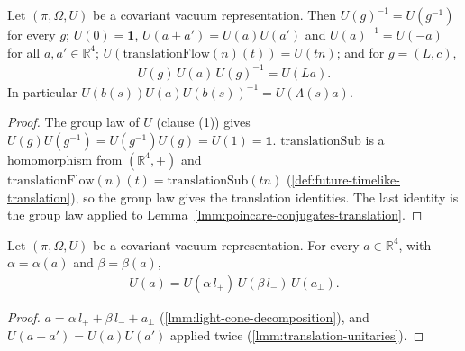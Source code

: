 \begin{lemma}
    \label{lmm:translation-unitaries}
    \leanok
    Let $(\pi, \Omega, U)$ be a covariant vacuum representation. Then $U(g)^{-1} = U(g^{-1})$ for every $g$; $U(0) = \mathbf{1}$, $U(a + a') = U(a)U(a')$ and $U(a)^{-1} = U(-a)$ for all $a, a' \in \mathbb{R}^4$; $U(\mathrm{translationFlow}(n)(t)) = U(tn)$; and for $g = (L, c)$,
    \begin{align}
        U(g)\,U(a)\,U(g)^{-1} = U(La).
    \end{align}
    In particular $U(b(s))U(a)U(b(s))^{-1} = U(\Lambda(s)a)$.
\end{lemma}
\begin{proof}
    \leanok
    The group law of $U$ (clause (1)) gives $U(g)U(g^{-1}) = U(g^{-1})U(g) = U(1) = \mathbf{1}$. $\mathrm{translationSub}$ is a homomorphism from $(\mathbb{R}^4, +)$ and $\mathrm{translationFlow}(n)(t) = \mathrm{translationSub}(tn)$ (\ref{def:future-timelike-translation}), so the group law gives the translation identities. The last identity is the group law applied to Lemma~\ref{lmm:poincare-conjugates-translation}.
\end{proof}

\begin{lemma}
    \label{lmm:translation-light-cone-factorisation}
    \leanok
    Let $(\pi, \Omega, U)$ be a covariant vacuum representation. For every $a \in \mathbb{R}^4$, with $\alpha = \alpha(a)$ and $\beta = \beta(a)$,
    \begin{align}
        U(a) = U(\alpha\,l_+)\,U(\beta\,l_-)\,U(a_\perp).
    \end{align}
\end{lemma}
\begin{proof}
    \leanok
    $a = \alpha\,l_+ + \beta\,l_- + a_\perp$ (\ref{lmm:light-cone-decomposition}), and $U(a + a') = U(a)U(a')$ applied twice (\ref{lmm:translation-unitaries}).
\end{proof}

